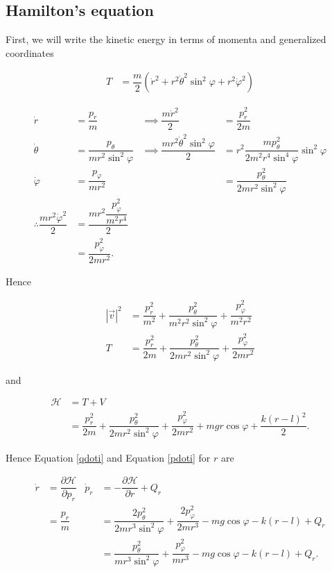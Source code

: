 \documentclass[12pt,a4paper,portrait]{article}
\newcommand{\ham}{\mathcal{H}}
\newcommand{\eq}[1]{Equation \eqref{#1}}
\begin{document}
\begin{landscape}
\subsection{Hamilton's equation}
First, we will write the kinetic energy in terms of momenta and generalized coordinates

\begin{align*}
	T &= \dfrac{m}{2}\left(\dot{r}^2 + r^2\dot{\theta}^2\sin^2{\varphi} + r^2\dot{\varphi}^2\right)
\end{align*}

\begin{align*}
	\dot{r} &= \dfrac{p_r}{m} &\implies \dfrac{m\dot{r}^2}{2} &= \dfrac{p_r^2}{2m}\\
	\dot{\theta} &= \dfrac{p_{\theta}}{mr^2\sin^2{\varphi}} & \implies \dfrac{mr^2\dot{\theta}^2\sin^2{\varphi}}{2} &= r^2\dfrac{mp_{\theta}^2}{2m^2r^4\sin^4{\varphi}}\sin^2{\varphi}\\
	\dot{\varphi} &= \dfrac{p_{\varphi}}{mr^2} & &= \dfrac{p_{\theta}^2}{2mr^2\sin^2{\varphi}}\\
	\therefore \dfrac{mr^2\dot{\varphi}^2}{2} &= \dfrac{mr^2 \dfrac{p_{\varphi}^2}{m^2r^4}}{2} \\
	&= \dfrac{p_{\varphi}^2}{2mr^2}.
\end{align*}

Hence

\begin{align*}
	|\vec{v}|^2 &= \dfrac{p_r^2}{m^2} + \dfrac{p_{\theta}^2}{m^2r^2\sin^2{\varphi}} + \dfrac{p_{\varphi}^2}{m^2r^2} \\
	T &= \dfrac{p_r^2}{2m} + \dfrac{p_{\theta}^2}{2mr^2\sin^2{\varphi}} + \dfrac{p_{\varphi}^2}{2mr^2}
\end{align*}

and

\begin{align*}
	\ham &= T + V \\
	&= \dfrac{p_r^2}{2m} + \dfrac{p_{\theta}^2}{2mr^2\sin^2{\varphi}} + \dfrac{p_{\varphi}^2}{2mr^2} + mgr\cos{\varphi} + \dfrac{k(r-l)^2}{2}.
\end{align*}

Hence \eq{qdoti} and \eq{pdoti} for $r$ are

\begin{align*}
	\dot{r} &= \dfrac{\partial \ham}{\partial p_r} & \dot{p}_r &= -\dfrac{\partial \ham}{\partial r} + Q_r \\
	&= \dfrac{p_r}{m} & &= \dfrac{2p_{\theta}^2}{2mr^3\sin^2{\varphi}} + \dfrac{2p_{\varphi}^2}{2mr^3} - mg\cos{\varphi} - k(r-l) + Q_r\\
	& & &= \dfrac{p_{\theta}^2}{mr^3\sin^2{\varphi}} + \dfrac{p_{\varphi}^2}{mr^3} - mg\cos{\varphi} - k(r-l) + Q_r.
\end{align*}


\end{landscape}
\end{document}
